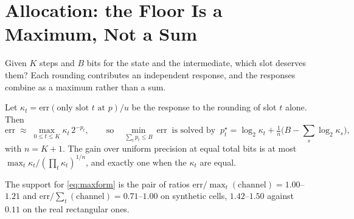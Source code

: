 \section{Allocation: the Floor Is a Maximum, Not a Sum}
\label{sec:alloc}

Given $K$ steps and $B$ bits for the state and the intermediate, which slot deserves
them?  Each rounding contributes an independent response, and the
responses combine as a maximum rather than a sum.

\begin{proposition}
\label{prop:max}
Let $\kappa_t = \mathrm{err}(\text{only slot } t \text{ at } p)/u$ be the response
to the rounding of slot $t$ alone.  Then
\begin{equation}
\mathrm{err} \;\approx\; \max_{0\le t\le K} \kappa_t\,2^{-p_t},
\qquad\text{so}\quad
\min_{\sum_t p_t \le B}\ \mathrm{err}
\ \text{ is solved by }\
p_t^\star = \log_2 \kappa_t + \tfrac{1}{n}\bigl(B - \textstyle\sum_s \log_2\kappa_s\bigr),
\label{eq:maxform}
\end{equation}
with $n = K+1$.  The gain over uniform precision at equal total bits is at most
$\max_t \kappa_t / (\prod_t \kappa_t)^{1/n}$, and exactly one when the $\kappa_t$ are
equal.
\end{proposition}

The support for \eqref{eq:maxform} is the pair of ratios
$\mathrm{err}/\max_t(\text{channel}) = 1.00$--$1.21$ and
$\mathrm{err}/\sum_t(\text{channel}) = 0.71$--$1.00$ on synthetic cells, $1.42$--$1.50$
against $0.11$ on the real rectangular ones.

